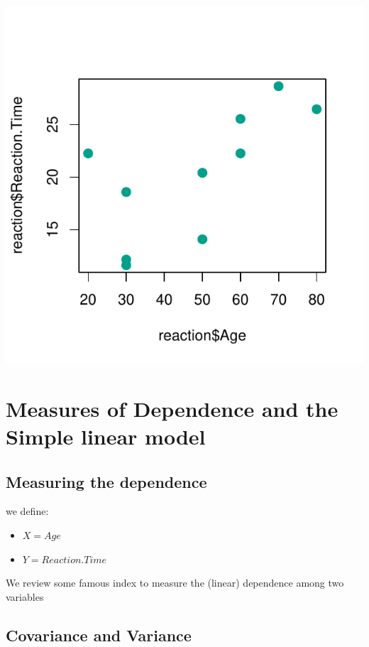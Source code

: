 \documentclass[]{article}
\providecommand{\tightlist}{%
  \setlength{\itemsep}{0pt}\setlength{\parskip}{0pt}}
\begin{document}
\begin{center}\includegraphics{inference_booklet_files/figure-latex/unnamed-chunk-3-1} \end{center}

\section{Measures of Dependence and the Simple linear
model}\label{measures-of-dependence-and-the-simple-linear-model}

\subsection{Measuring the dependence}\label{measuring-the-dependence}

we define:

\begin{itemize}
\tightlist
\item
  \(X=Age\)\\
\item
  \(Y=Reaction.Time\)
\end{itemize}

We review some famous index to measure the (linear) dependence among two
variables

\subsection{Covariance and Variance}\label{covariance-and-variance}
\end{document}
